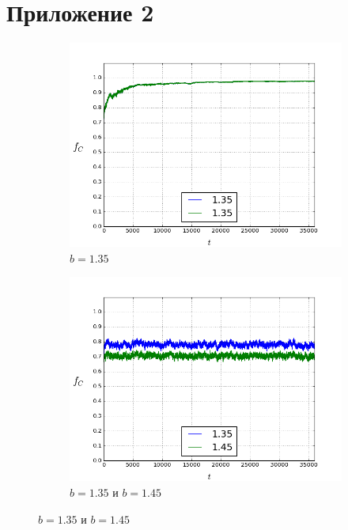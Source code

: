 \documentclass[a4paper]{article}
\begin{document}
	\section{Приложение 2}
\begin{figure}[H]
	\begin{subfigure}{.5\textwidth}
		\includegraphics[width=.8\linewidth]{135-135.png}
		\caption{$b=1.35$}
	\end{subfigure}
	\begin{subfigure}{.5\textwidth}
		\includegraphics[width=.8\linewidth]{135-145.png}
		\caption{$b=1.35$ и $b=1.45$}
	\end{subfigure}%
\end{figure}
\end{document}
